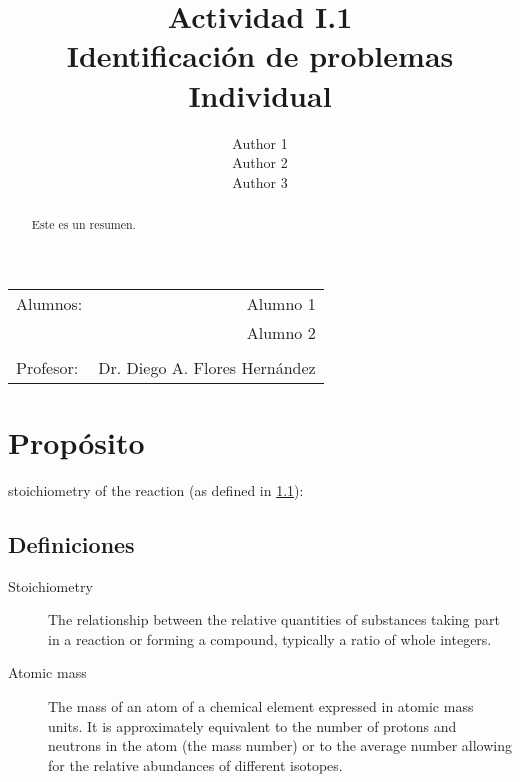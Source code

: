 \documentclass[11pt,letterpaper]{article}
\title{\textbf{Actividad I.1}\\ Identificaci\'on de problemas \\ Individual}
\author{Author 1\\
    Author 2\\
    Author 3}
\begin{document}
 
\begin{center}
\begin{tabular}{l r}
Alumnos: & Alumno 1 \\
& Alumno 2 \\
\\
Profesor: & Dr. Diego A. Flores Hern\'andez 
\end{tabular}
\end{center}


 \begin{abstract}
Este es un resumen. 
 \end{abstract}


\section{Prop\'osito}


stoichiometry of the reaction (as defined in \ref{Subsec:Def}):

\begin{center}\end{center}



\subsection{Definiciones} \label{Subsec:Def}
\begin{description}
\item[Stoichiometry]
The relationship between the relative quantities of substances taking part in a reaction or forming a compound, typically a ratio of whole integers.
\item[Atomic mass]
The mass of an atom of a chemical element expressed in atomic mass units. It is approximately equivalent to the number of protons and neutrons in the atom (the mass number) or to the average number allowing for the relative abundances of different isotopes. 
\end{description} 
 
\end{document}
